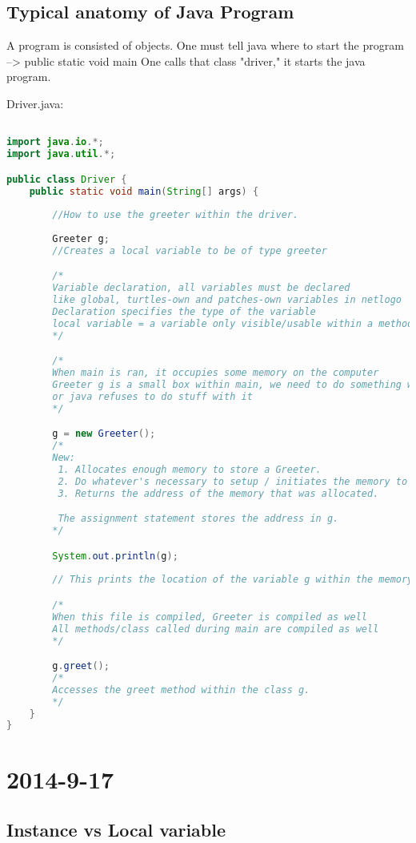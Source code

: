 \documentclass [12 pt, twoside] {article}
\begin{document}
\subsection{Typical anatomy of Java Program}


A program is consisted of objects.
One must tell java where to start the program --> public static void main
One calls that class "driver," it starts the java program.


Driver.java:
\begin{lstlisting}[language=Java]

import java.io.*;
import java.util.*;

public class Driver {
	public static void main(String[] args) {
		
		//How to use the greeter within the driver.
		
		Greeter g;
		//Creates a local variable to be of type greeter

		/*
		Variable declaration, all variables must be declared
		like global, turtles-own and patches-own variables in netlogo
		Declaration specifies the type of the variable
		local variable = a variable only visible/usable within a method, created when the method is called, destroyed when the function exits
		*/

		/*
		When main is ran, it occupies some memory on the computer
		Greeter g is a small box within main, we need to do something with it
		or java refuses to do stuff with it
		*/

		g = new Greeter();
		/*
		New:
		 1. Allocates enough memory to store a Greeter.
		 2. Do whatever's necessary to setup / initiates the memory to be a Greeter.
		 3. Returns the address of the memory that was allocated.

		 The assignment statement stores the address in g.
		*/

		System.out.println(g);
		
		// This prints the location of the variable g within the memory

		/*
		When this file is compiled, Greeter is compiled as well
		All methods/class called during main are compiled as well
		*/

		g.greet();
		/*
		Accesses the greet method within the class g.
		*/
	}
}
\end{lstlisting}
\section{2014-9-17}
\subsection{Instance vs Local variable}
\end{document}
